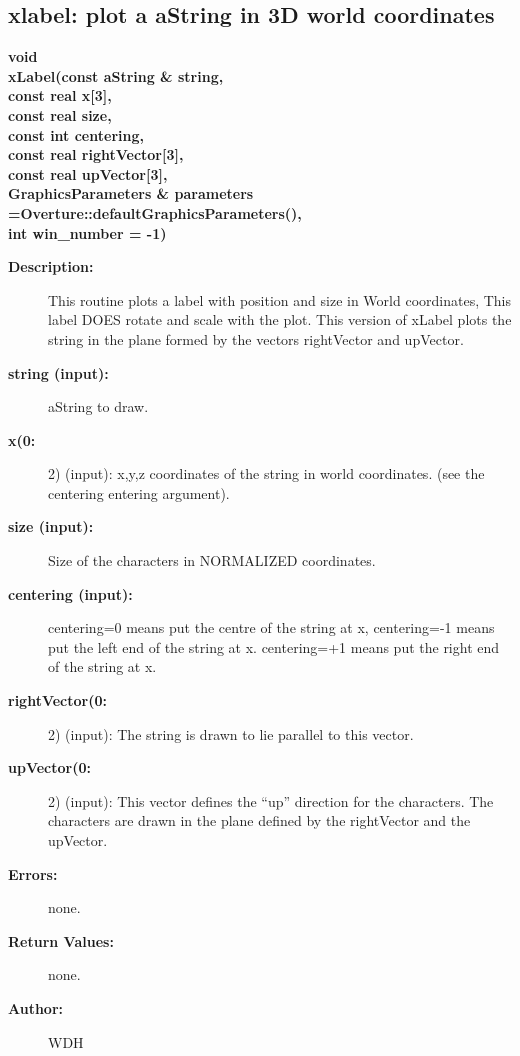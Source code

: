 \subsection{xlabel: plot a aString in 3D world coordinates}
 
\begin{flushleft} \textbf{%
void   \\ 
\settowidth{\GLGraphicsInterfaceIncludeArgIndent}{xLabel(}%
xLabel(const aString \& string,     \\ 
\hspace{\GLGraphicsInterfaceIncludeArgIndent}const real x[3],  \\ 
\hspace{\GLGraphicsInterfaceIncludeArgIndent}const real size,      \\ 
\hspace{\GLGraphicsInterfaceIncludeArgIndent}const int centering,\\ 
\hspace{\GLGraphicsInterfaceIncludeArgIndent}const real rightVector[3],  \\ 
\hspace{\GLGraphicsInterfaceIncludeArgIndent}const real upVector[3],\\ 
GraphicsParameters \& parameters   =Overture::defaultGraphicsParameters(),\\ 
\hspace{\GLGraphicsInterfaceIncludeArgIndent}int win\_number  = -1)
}\end{flushleft}
\begin{description}
\item[{\bf Description:}] 
    This routine plots a label with position and size in World coordinates, 
    This label DOES rotate and scale with the plot. This version of xLabel 
    plots the string in the plane formed by the vectors {\ff rightVector}
    and {\ff upVector}.
\item[{\bf string (input):}]  aString to draw.
\item[{\bf x(0:}] 2) (input): x,y,z coordinates of the string in world coordinates.
    (see the centering entering argument).
\item[{\bf size (input):}]  Size of the characters in NORMALIZED coordinates.
\item[{\bf centering (input):}]  {\ff centering=0} means put the centre of the string at {\ff x},
    {\ff centering=-1} means put the left end of the string at {\ff x}.
    {\ff centering=+1} means put the right end of the string at {\ff x}.
\item[{\bf rightVector(0:}] 2) (input): The string is drawn to lie parallel to this vector.
\item[{\bf upVector(0:}] 2) (input): This vector defines the ``up'' direction for the characters. The
     characters are drawn in the plane defined by the rightVector and the upVector.
\item[{\bf Errors:}]  none.
\item[{\bf Return Values:}]  none.
  
\item[{\bf Author:}]  WDH
\end{description}
